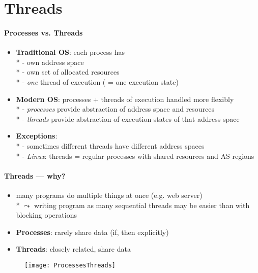 \section{Threads}

\paragraph{Processes vs. Threads}
\begin{itemize}
  \item \textbf{Traditional OS}: each process has \\*
    - own address space \\*
    - own set of allocated resources \\*
    - \emph{one} thread of execution ( = one execution state)
  \item \textbf{Modern OS}: processes + threads of execution handled more flexibly \\*
    - \emph{processes} provide abstraction of address space and resources \\*
    - \emph{threads} provide abstraction of execution states of that address space
  \item \textbf{Exceptions}: \\*
    - sometimes different threads have different address spaces \\*
    - \emph{Linux}: threads = regular processes with shared resources and AS regions
\end{itemize}

\paragraph{Threads --- why?}
\begin{itemize}
  \item many programs do multiple things at once (e.g. web server) \\*
    \( \leadsto \) writing program as many sequential threads may be easier than with blocking operations
  \item \textbf{Processes}: rarely share data (if, then explicitly)
  \item \textbf{Threads}: closely related, share data
\end{itemize}
\begin{figure}[h]\centering\label{ProcessesThreads}\texttt{[image: ProcessesThreads]}\end{figure}

